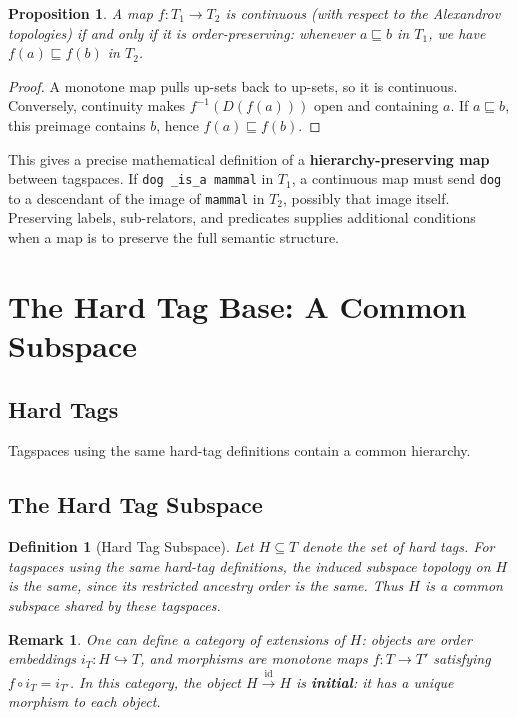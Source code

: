 \documentclass{article}
\newtheorem{definition}{Definition}[section]
\newtheorem{proposition}{Proposition}[section]
\newtheorem{remark}{Remark}[section]
\begin{document}
\begin{proposition}
A map $f : T_1 \to T_2$ is continuous (with respect to the Alexandrov
topologies) if and only if it is order-preserving: whenever
$a \sqsubseteq b$ in $T_1$, we have $f(a) \sqsubseteq f(b)$ in $T_2$.
\end{proposition}
\begin{proof}
A monotone map pulls up-sets back to up-sets, so it is continuous.
Conversely, continuity makes $f^{-1}(D(f(a)))$ open and containing $a$.
If $a\sqsubseteq b$, this preimage contains $b$, hence
$f(a)\sqsubseteq f(b)$.
\end{proof}

This gives a precise mathematical definition of a
\textbf{hierarchy-preserving map} between tagspaces. If
\texttt{dog \_is\_a mammal} in $T_1$, a continuous map must send \texttt{dog}
to a descendant of the image of \texttt{mammal} in $T_2$, possibly that
image itself. Preserving labels, sub-relators, and predicates supplies
additional conditions when a map is to preserve the full semantic structure.

\section{The Hard Tag Base: A Common Subspace}

\subsection{Hard Tags}

Tagspaces using the same hard-tag definitions contain a common hierarchy.

\subsection{The Hard Tag Subspace}

\begin{definition}[Hard Tag Subspace]
Let $H \subseteq T$ denote the set of hard tags. For tagspaces using the same
hard-tag definitions, the induced subspace topology on $H$ is the same,
since its restricted ancestry order is the same. Thus $H$ is a common
subspace shared by these tagspaces.
\end{definition}

\begin{remark}
One can define a category of extensions of $H$: objects are order embeddings
$i_T:H\hookrightarrow T$, and morphisms are monotone maps $f:T\to T'$
satisfying $f\circ i_T=i_{T'}$. In this category,
the object $H\xrightarrow{\mathrm{id}}H$ is \textbf{initial}: it has a unique
morphism to each object.
\end{remark}
\end{document}
